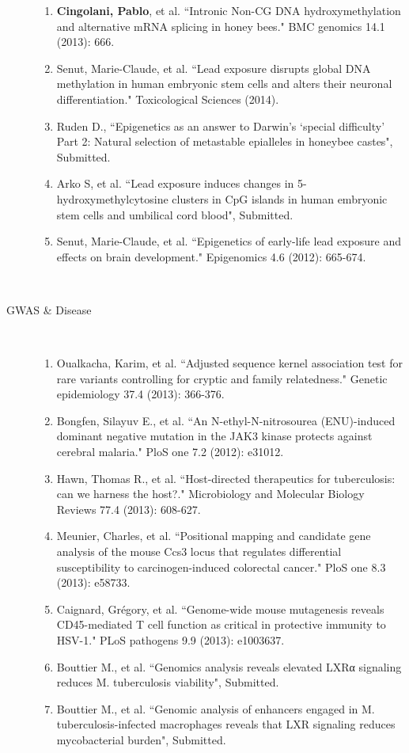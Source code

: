 \begin{description}
		\begin{enumerate}[resume]
			\item \textbf{Cingolani, Pablo}, et al. ``Intronic Non-CG DNA hydroxymethylation and alternative mRNA splicing in honey bees." BMC genomics 14.1 (2013): 666.
			\item Senut, Marie-Claude, et al. ``Lead exposure disrupts global DNA methylation in human embryonic stem cells and alters their neuronal differentiation." Toxicological Sciences (2014).
			\item Ruden D., ``Epigenetics as an answer to Darwin’s ‘special difficulty’ Part 2: Natural selection of metastable epialleles in honeybee castes", Submitted.
			\item Arko S, et al. ``Lead exposure induces changes in 5-hydroxymethylcytosine clusters in CpG islands in human embryonic stem cells and umbilical cord blood", Submitted.
			\item Senut, Marie-Claude, et al. ``Epigenetics of early-life lead exposure and effects on brain development." Epigenomics 4.6 (2012): 665-674.
		\end{enumerate}
		~ \\
	
	\item[GWAS \& Disease] ~
	
		\begin{enumerate}[resume]
			\item Oualkacha, Karim, et al. ``Adjusted sequence kernel association test for rare variants controlling for cryptic and family relatedness." Genetic epidemiology 37.4 (2013): 366-376.
			\item Bongfen, Silayuv E., et al. ``An N-ethyl-N-nitrosourea (ENU)-induced dominant negative mutation in the JAK3 kinase protects against cerebral malaria." PloS one 7.2 (2012): e31012.
			\item Hawn, Thomas R., et al. ``Host-directed therapeutics for tuberculosis: can we harness the host?." Microbiology and Molecular Biology Reviews 77.4 (2013): 608-627.
			\item Meunier, Charles, et al. ``Positional mapping and candidate gene analysis of the mouse Ccs3 locus that regulates differential susceptibility to carcinogen-induced colorectal cancer." PloS one 8.3 (2013): e58733.
			\item Caignard, Grégory, et al. ``Genome-wide mouse mutagenesis reveals CD45-mediated T cell function as critical in protective immunity to HSV-1." PLoS pathogens 9.9 (2013): e1003637.
			\item Bouttier M., et al. ``Genomics analysis reveals elevated LXRα signaling reduces M. tuberculosis viability", Submitted.
			\item Bouttier M., et al. ``Genomic analysis of enhancers engaged in M. tuberculosis-infected macrophages reveals that LXR signaling reduces mycobacterial burden", Submitted.
		\end{enumerate}	
		~ \\
	

\end{description}
